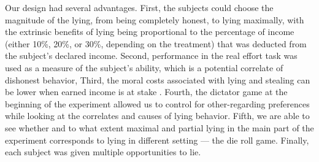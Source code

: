 \documentclass[12pt]{article}
\begin{document}
\par Our design had several advantages. First, the subjects could choose the magnitude of the lying, from being completely honest, to lying maximally, with the extrinsic benefits of lying being proportional to the percentage of income (either 10\%, 20\%, or 30\%, depending on the treatment) that was deducted from the subject’s declared income.\footnotemark{} 
Second, performance in the real effort task was used as a measure of the subject’s ability, which is a potential correlate of dishonest behavior,\footnotemark{} 
Third, the moral costs associated with lying and stealing can be lower when earned income is at stake \citep{gravert2013luck}.
Fourth, the dictator game at the beginning of the experiment allowed us to control for other-regarding preferences while looking at the correlates and causes of lying behavior.\footnotemark{} 
Fifth, we are able to see whether and to what extent maximal and partial lying in the main part of the experiment corresponds to lying in different setting --- the die roll game.  
Finally, each subject was given multiple opportunities to lie. 


\end{document}
